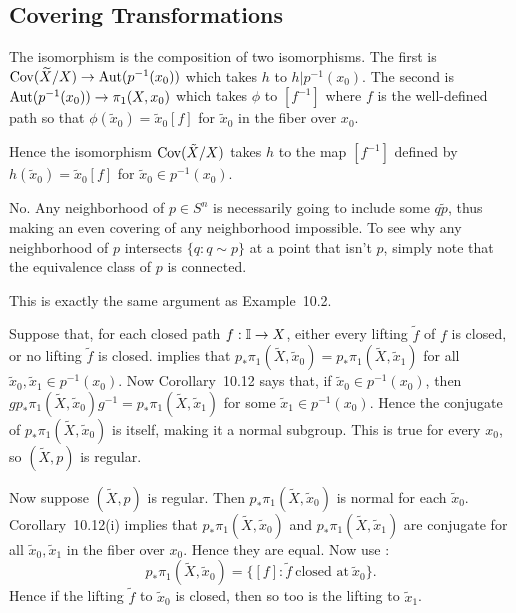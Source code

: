 \documentclass[../../solutions.tex]{subfiles}
\begin{document}
\subsection{Covering Transformations}
\begin{exercise} \leavevmode
The isomorphism is the composition of two isomorphisms.
The first is $\operatorname{Cov}(\widetilde X/X)\to\operatorname{Aut}(p^{-1}(x_0))$ which takes $h$ to $h|p^{-1}(x_0)$.
The second is $\operatorname{Aut}(p^{-1}(x_0))\to\pi_1(X,x_0)$ which takes $\phi$ to $[f^{-1}]$ where $f$ is the well-defined path so that $\phi(\tilde x_0)=\tilde x_0[f]$ for $\tilde x_0$ in the fiber over $x_0$.

Hence the isomorphism $\operatorname{Cov}(\tilde X/X)$ takes $h$ to the map $[f^{-1}]$ defined by $h(\tilde x_0)=\tilde x_0[f]$ for $\tilde x_0\in p^{-1}(x_0)$.
\end{exercise}

\begin{exercise} \leavevmode
No.
Any neighborhood of $p\in S^n$ is necessarily going to include some $q\tilde p$, thus making an even covering of any neighborhood impossible.
To see why any neighborhood of $p$ intersects $\{q:q\sim p\}$ at a point that isn't $p$, simply note that the equivalence class of $p$ is connected.
\end{exercise}

\begin{exercise} \leavevmode
This is exactly the same argument as Example~10.2.
\end{exercise}

\begin{exercise} \leavevmode
Suppose that, for each closed path $f:\mathbb I\to X$, either every lifting $\tilde f$ of $f$ is closed, or no lifting $\tilde f$ is closed.
 implies that $p_*\pi_1(\widetilde X,\tilde x_0)=p_*\pi_1(\widetilde X,\tilde x_1)$ for all $\tilde x_0,\tilde x_1\in p^{-1}(x_0)$.
Now Corollary~10.12 says that, if $\tilde x_0\in p^{-1}(x_0)$, then $gp_*\pi_1(\widetilde X,\tilde x_0)g^{-1}=p_*\pi_1(\widetilde X,\tilde x_1)$ for some $\tilde x_1\in p^{-1}(x_0)$.
Hence the conjugate of $p_*\pi_1(\widetilde X,\tilde x_0)$ is itself, making it a normal subgroup.
This is true for every $x_0$, so $(\widetilde X,p)$ is regular.

Now suppose $(\widetilde X,p)$ is regular.
Then $p_*\pi_1(\widetilde X,\tilde x_0)$ is normal for each $\tilde x_0$.
Corollary~10.12(i) implies that $p_*\pi_1(\widetilde X,\tilde x_0)$ and $p_*\pi_1(\widetilde X,\tilde x_1)$ are conjugate for all $\tilde x_0,\tilde x_1$ in the fiber over $x_0$.
Hence they are equal.
Now use :
\[p_*\pi_1(\widetilde X,\tilde x_0)=\{[f]:\tilde f~\text{closed at}~\tilde x_0\}.\]
Hence if the lifting $\tilde f$ to $\tilde x_0$ is closed, then so too is the lifting to $\tilde x_1$.
\end{exercise}
\end{document}
